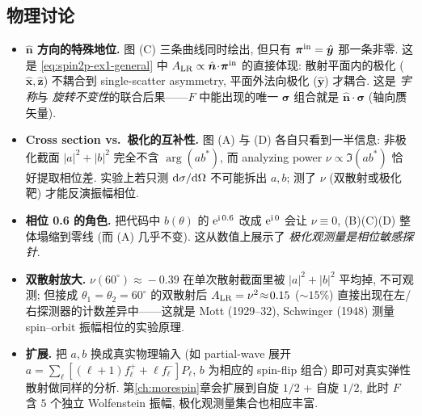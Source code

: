 \subsection*{物理讨论}
\begin{itemize}\itemsep=2pt
  \item \textbf{$\hat{\bm n}$ 方向的特殊地位.} 图 (C) 三条曲线同时绘出, 但只有 $\bm\pi^{\rm in}=\hat{\bm y}$ 那一条非零. 这是 \eqref{eq:spin2p-ex1-general} 中 $A_{\rm LR}\propto\hat{\bm n}\!\cdot\!\bm\pi^{\rm in}$ 的直接体现: 散射平面内的极化 ($\hat{\bm x},\hat{\bm z}$) 不耦合到 single-scatter asymmetry, 平面外法向极化 ($\hat{\bm y}$) 才耦合. 这是 \emph{宇称}与 \emph{旋转不变性}的联合后果——$F$ 中能出现的唯一 $\bm\sigma$ 组合就是 $\hat{\bm n}\!\cdot\!\bm\sigma$ (轴向赝矢量).
  \item \textbf{Cross section vs.\ 极化的互补性.} 图 (A) 与 (D) 各自只看到一半信息: 非极化截面 $|a|^2+|b|^2$ 完全不含 $\arg(ab^*)$, 而 analyzing power $\nu\propto\Im(ab^*)$ 恰好提取相位差. 实验上若只测 $\mathrm{d}\sigma/\mathrm{d}\Omega$ 不可能拆出 $a,b$; 测了 $\nu$ (双散射或极化靶) 才能反演振幅相位.
  \item \textbf{相位 0.6 的角色.} 把代码中 $b(\theta)$ 的 $\mathrm{e}^{\mathrm{i}\,0.6}$ 改成 $\mathrm{e}^{\mathrm{i}\,0}$ 会让 $\nu\equiv 0$, (B)(C)(D) 整体塌缩到零线 (而 (A) 几乎不变). 这从数值上展示了 \emph{极化观测量是相位敏感探针}.
  \item \textbf{双散射放大.} $\nu(60^\circ)\!\approx\!-0.39$ 在单次散射截面里被 $|a|^2+|b|^2$ 平均掉, 不可观测; 但接成 $\theta_1=\theta_2=60^\circ$ 的双散射后 $A_{\rm LR}=\nu^2\!\approx\!0.15$ ($\sim 15\%$) 直接出现在左/右探测器的计数差异中——这就是 Mott (1929--32), Schwinger (1948) 测量 spin--orbit 振幅相位的实验原理.
  \item \textbf{扩展.} 把 $a,b$ 换成真实物理输入 (如 partial-wave 展开 $a=\sum_\ell[(\ell+1)f_\ell^++\ell f_\ell^-]P_\ell$, $b$ 为相应的 spin-flip 组合) 即可对真实弹性散射做同样的分析. 第\ref{ch:morespin}章会扩展到自旋 $1/2$ + 自旋 $1/2$, 此时 $F$ 含 $5$ 个独立 Wolfenstein 振幅, 极化观测量集合也相应丰富.
\end{itemize}
